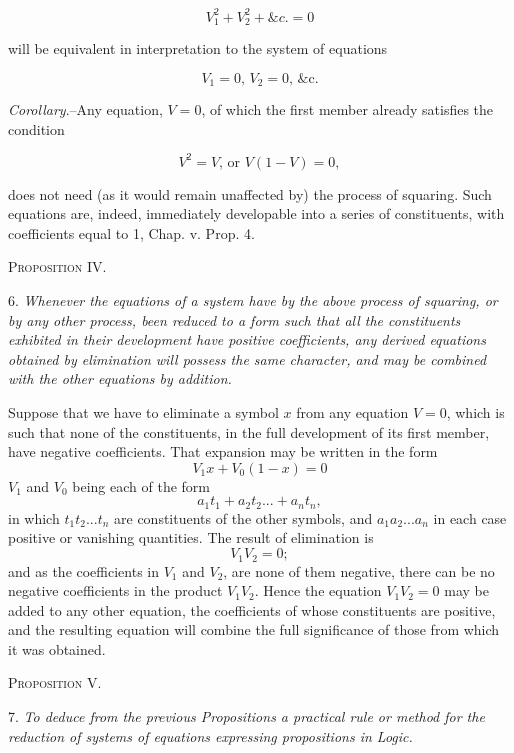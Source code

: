 \documentclass[oneside]{book}
\begin{document}
\[
V_{1}^2 + V_{2}^2 +\&c. = 0
\]

will be equivalent in interpretation to the system of equations

\[
V_1=0 \textrm{, } V_2=0\textrm{, \&c.}
\]

\textit{Corollary}.--Any equation, $V=0$, of which the first member
already satisfies the condition

\[
V^2=V \textrm{, or } V(1-V)=0,
\]

does not need (as it would remain unaffected by) the process of
squaring. Such equations are, indeed, immediately developable
into a series of constituents, with coefficients equal to 1, Chap. v.
Prop. 4.


\begin{center}
\textsc{Proposition IV.}
\end{center}

6. \textit{Whenever the equations of a system have by the above process
of squaring, or by any other process, been reduced to a form
such that all the constituents exhibited in their development have
positive coefficients, any derived equations obtained by elimination
will possess the same character, and may be combined with the
other equations by addition.}

Suppose that we have to eliminate a symbol $x$ from any
equation $V = 0$, which is such that none of the constituents, in
the full development of its first member, have negative coefficients.
That expansion may be written in the form
\[
V_{1} x+V_{0}(1-x)=0
\]
$V_{1}$ and $V_{0}$ being each of the form
\[
a_{1}t_{1}+a_{2}t_{2}...+a_{n}t_{n},
\]
in which $t_{1}t_{2}... t_{n}$ are constituents of the other symbols, and
$a_{1}a_{2}...a_{n}$ in each case positive or vanishing quantities. The result of elimination is
\[
V_{1}V_{2}=0;
\]
and as the coefficients in $V_{1}$ and $V_{2}$, are none of them negative,
there can be no negative coefficients in the product $V_{1}V_{2}$.
Hence the equation $V_{1}V_{2}=0$ may be added to any other equation,
the coefficients of whose constituents are positive, and the
resulting equation will combine the full significance of those
from which it was obtained.

\begin{center}
\textsc{Proposition V.}
\end{center}

7. \textit{To deduce from the previous Propositions a practical rule or
method for the reduction of systems of equations expressing propositions in Logic.}
\end{document}
